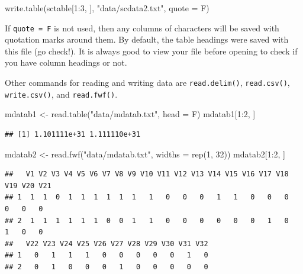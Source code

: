 \documentclass[
]{book}
\newenvironment{Shaded}{\begin{snugshade}}{\end{snugshade}}
\newcommand{\AttributeTok}[1]{\textcolor[rgb]{0.77,0.63,0.00}{#1}}
\newcommand{\DecValTok}[1]{\textcolor[rgb]{0.00,0.00,0.81}{#1}}
\newcommand{\FunctionTok}[1]{\textcolor[rgb]{0.00,0.00,0.00}{#1}}
\newcommand{\NormalTok}[1]{#1}
\newcommand{\OtherTok}[1]{\textcolor[rgb]{0.56,0.35,0.01}{#1}}
\newcommand{\SpecialCharTok}[1]{\textcolor[rgb]{0.00,0.00,0.00}{#1}}
\newcommand{\StringTok}[1]{\textcolor[rgb]{0.31,0.60,0.02}{#1}}
\begin{document}
\begin{Shaded}
\begin{Highlighting}[]
\FunctionTok{write.table}\NormalTok{(sctable[}\DecValTok{1}\SpecialCharTok{:}\DecValTok{3}\NormalTok{, ], }\StringTok{"data/scdata2.txt"}\NormalTok{, }\AttributeTok{quote =}\NormalTok{ F)}
\end{Highlighting}
\end{Shaded}

If \texttt{quote\ =\ F} is not used, then any columns of characters will be saved with quotation marks around them. By default, the table headings were saved with this file (go check!). It is always good to view your file before opening to check if you have column headings or not.

Other commands for reading and writing data are \texttt{read.delim()}, \texttt{read.csv()}, \texttt{write.csv()}, and \texttt{read.fwf()}.

\begin{Shaded}
\begin{Highlighting}[]
\NormalTok{mdatab1 }\OtherTok{\textless{}{-}} \FunctionTok{read.table}\NormalTok{(}\StringTok{"data/mdatab.txt"}\NormalTok{, }\AttributeTok{head =}\NormalTok{ F)}
\NormalTok{mdatab1[}\DecValTok{1}\SpecialCharTok{:}\DecValTok{2}\NormalTok{, ]}
\end{Highlighting}
\end{Shaded}

\begin{verbatim}
## [1] 1.101111e+31 1.111110e+31
\end{verbatim}

\begin{Shaded}
\begin{Highlighting}[]
\NormalTok{mdatab2 }\OtherTok{\textless{}{-}} \FunctionTok{read.fwf}\NormalTok{(}\StringTok{"data/mdatab.txt"}\NormalTok{, }\AttributeTok{widths =} \FunctionTok{rep}\NormalTok{(}\DecValTok{1}\NormalTok{, }\DecValTok{32}\NormalTok{))}
\NormalTok{mdatab2[}\DecValTok{1}\SpecialCharTok{:}\DecValTok{2}\NormalTok{, ]}
\end{Highlighting}
\end{Shaded}

\begin{verbatim}
##   V1 V2 V3 V4 V5 V6 V7 V8 V9 V10 V11 V12 V13 V14 V15 V16 V17 V18 V19 V20 V21
## 1  1  1  0  1  1  1  1  1  1   1   0   0   0   1   1   0   0   0   0   0   0
## 2  1  1  1  1  1  1  0  0  1   1   0   0   0   0   0   0   1   0   1   0   0
##   V22 V23 V24 V25 V26 V27 V28 V29 V30 V31 V32
## 1   0   1   1   1   0   0   0   0   0   1   0
## 2   0   1   0   0   0   1   0   0   0   0   0
\end{verbatim}
\end{document}
